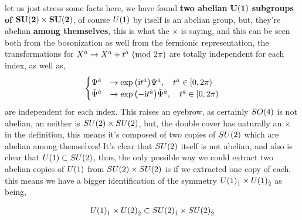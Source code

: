 let us just stress some facts here, we have found \textbf{two abelian }$\vb{U\qty(1)}$ \textbf{subgroups of }$\vb{SU\qty(2)\times SU\qty(2)}$, of course $U\qty(1)$ 
by itself is an abelian group, but, they're abelian \textbf{among themselves}, this is what the $\times$ is saying, and this can be seen both from the bosonization 
as well from the fermionic representation, the transformations for $X^{\dot a}\rightarrow X^{\dot a}+t^{\dot a}\ \qty(\textnormal{mod }2\pi)$ are totally independent 
for each index, as well as,
\begin{align*}
    \begin{cases}
        \Psi^{\dot a}&\rightarrow\exp\qty(\textnormal{i} t^{\dot a})\Psi^{\dot a},\ \ \ t^{\dot a}\in[0,2\pi)\\
        {\tilde\Psi}^{\dot a}&\rightarrow\exp\qty(-\textnormal{i} t^{\dot a}){\tilde\Psi}^{\dot a},\ \ \ t^{\dot a}\in[0,2\pi)
    \end{cases}
\end{align*}
are independent for each index. This raises an eyebrow, as certainly $SO\qty(4)$ is not abelian, an neither is $SU\qty(2)\times SU\qty(2)$, but, 
the double cover has naturally an $\times$ in the definition, this means it's composed of two copies of $SU\qty(2)$ which are abelian among themselves! 
It's clear that $SU\qty(2)$ itself is not abelian, and also is clear that $U\qty(1)\subset SU\qty(2)$, thus, the only possible way we could extract two abelian 
copies of $U\qty(1)$ from $SU\qty(2)\times SU\qty(2)$ is if we extracted one copy of each, this means we have a bigger identification of the symmetry $U\qty(1)_{\dot1}\times U\qty(1)_{\dot 2}$ as being,

\begin{align*}
    U\qty(1)_{\dot 1}\times U\qty(2)_{\dot 2}\subset SU\qty(2)_{\dot 1}\times SU\qty(2)_{\dot 2}
\end{align*}

